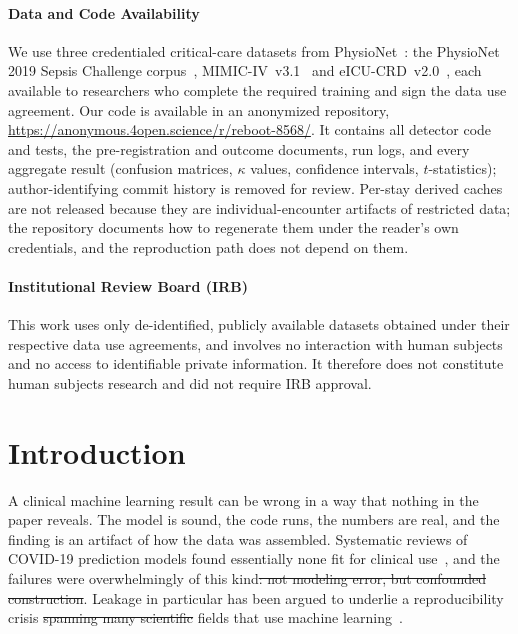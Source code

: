 \documentclass[pmlr,twocolumn,10pt]{jmlr}
\DeclareRobustCommand{\DIFadd}[1]{{\color{blue}\uwave{#1}}} %
\DeclareRobustCommand{\DIFdel}[1]{{\color{red}\sout{#1}}} %
\providecommand{\DIFaddbegin}{} %
\providecommand{\DIFaddend}{} %
\providecommand{\DIFdelbegin}{} %
\providecommand{\DIFdelend}{} %
\begin{document}
\ifmlhneedsstatements
\paragraph*{Data and Code Availability}
We use three credentialed critical-care datasets from
PhysioNet~\citep{goldberger2000physiobank}: the PhysioNet 2019 Sepsis Challenge
corpus~\citep{reyna2020early}, MIMIC-IV~v3.1~\citep{johnson2023mimiciv} and
eICU-CRD~v2.0~\citep{pollard2018eicu}, each available to researchers who
complete the required training and sign the data use agreement. Our code is
available in an anonymized repository, \url{https://anonymous.4open.science/r/reboot-8568/}. It
contains all detector code and tests, the pre-registration and outcome
documents, run logs, and every aggregate result (confusion matrices, $\kappa$
values, confidence intervals, $t$-statistics); author-identifying commit history
is removed for review. Per-stay derived caches are not released because they are
individual-encounter artifacts of restricted data; the repository documents how
to regenerate them under the reader's own credentials, and the reproduction path
does not depend on them.

\paragraph*{Institutional Review Board (IRB)}
This work uses only de-identified, publicly available datasets obtained under
their respective data use agreements, and involves no interaction with human
subjects and no access to identifiable private information. It therefore does
not constitute human subjects research and did not require IRB approval.
\fi

\section{Introduction}
\label{sec:intro}

A clinical machine learning result can be wrong in a way that nothing in the
paper reveals. The model is sound, the code runs, the numbers are real, and the
finding is an artifact of how the data was assembled. Systematic reviews of
COVID-19 prediction models found essentially none fit for clinical
use~\citep{wynants2020prediction,roberts2021common}, and the failures were
overwhelmingly of this kind\DIFdelbegin \DIFdel{: not modeling error, but confounded construction}\DIFdelend . Leakage in particular has been argued to underlie a
reproducibility crisis \DIFdelbegin \DIFdel{spanning many scientific }\DIFdelend \DIFaddbegin \DIFadd{across }\DIFaddend fields that use machine
learning~\citep{kapoor2023leakage}.
\end{document}
